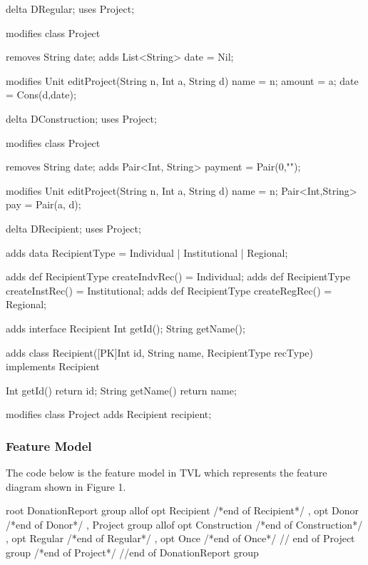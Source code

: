 \documentclass[runningheads,a4paper]{llncs}
\begin{document}
\begin{abscode}
	delta DRegular;
	uses Project;
	
	modifies class Project {
		removes String date;
		adds List<String> date = Nil;
		
		modifies Unit editProject(String n, Int a, String d) {
			name = n;
			amount = a;
			date = Cons(d,date);
		}
	}
\end{abscode}

\begin{abscode}
	delta DConstruction;
	uses Project;
	
	modifies class Project {
		
		removes String date;
		adds Pair<Int, String> payment = Pair(0,"");
		
		modifies Unit editProject(String n, Int a, String d) {
			name = n;
			Pair<Int,String> pay = Pair(a, d);
		}
		
	}	
\end{abscode}

\begin{abscode}
	delta DRecipient;
	uses Project;
	
	adds data RecipientType = Individual | Institutional | Regional;
	
	adds def RecipientType createIndvRec() = Individual;
	adds def RecipientType createInstRec() = Institutional;
	adds def RecipientType createRegRec() = Regional;
	
	adds interface Recipient {
		Int getId();
		String getName();
	}
	
	adds class Recipient([PK]Int id, String name, RecipientType recType) 
	implements Recipient {
		
		Int getId() { return id; }
		String getName() { return name; }
	}
	
	modifies class Project {
		adds Recipient recipient;
	}
\end{abscode}

\subsubsection{Feature Model}
The code below is the feature model in \textmu TVL which represents the feature diagram shown in Figure 1.

\begin{abscode}
	root DonationReport {
		group allof {
			opt Recipient /*end of Recipient*/ ,
			opt Donor /*end of Donor*/ ,
			Project {
				group allof {
					opt Construction /*end of Construction*/ , 
					opt Regular /*end of Regular*/ , 
					opt Once /*end of Once*/ 
				} // end of Project group
			} /*end of Project*/  
		} //end of DonationReport group
	}
\end{abscode}
\end{document}
